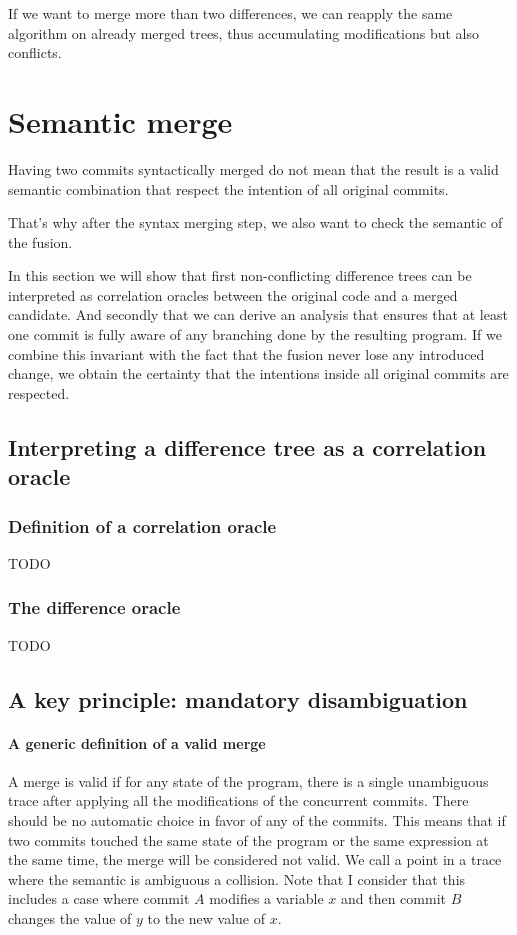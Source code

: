 \documentclass[a4paper,10pt]{article}
\begin{document}
If we want to merge more than two differences, we can reapply the same algorithm on already merged trees, thus accumulating modifications but also conflicts.

\section{Semantic merge}
Having two commits syntactically merged do not mean that the result is a valid semantic combination that respect the intention of all original commits.

That's why after the syntax merging step, we also want to check the semantic of the fusion.

In this section we will show that first non-conflicting difference trees can be interpreted as correlation oracles between the original code and a merged candidate. And secondly that we can derive an analysis that ensures that at least one commit is fully aware of any branching done by the resulting program. If we combine this invariant with the fact that the fusion never lose any introduced change, we obtain the certainty that the intentions inside all original commits are respected.

\subsection{Interpreting a difference tree as a correlation oracle}
\subsubsection{Definition of a correlation oracle}
TODO

\subsubsection{The difference oracle}
TODO

\subsection{A key principle: mandatory disambiguation}
\paragraph{A generic definition of a valid merge} A merge is valid if for any state of the program, there is a single unambiguous trace after applying all the modifications of the concurrent commits. There should be no automatic choice in favor of any of the commits. This means that if two commits touched the same state of the program or the same expression at the same time, the merge will be considered not valid. We call a point in a trace where the semantic is ambiguous a collision.
Note that I consider that this includes a case where commit $A$ modifies a variable $x$ and then commit $B$ changes the value of $y$ to the new value of $x$.
\end{document}
